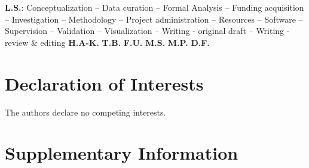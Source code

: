 \documentclass[5p]{elsarticle}
\begin{document}

\textbf{L.S.}:
Conceptualization --
Data curation --
Formal Analysis --
Funding acquisition --
Investigation --
Methodology --
Project administration --
Resources --
Software --
Supervision --
Validation --
Visualization --
Writing - original draft --
Writing - review \& editing
\textbf{H.A-K.}
\textbf{T.B.}
\textbf{F.U.}
\textbf{M.S.}
\textbf{M.P.}
\textbf{D.F.}




\section*{Declaration of Interests}

The authors declare no competing interests.

\renewcommand{\ttdefault}{\sfdefault}



\newpage
\onecolumn

\makeatletter
\renewcommand \thesection{S\@arabic\c@section}
\renewcommand\thetable{S\@arabic\c@table}
\renewcommand \thefigure{S\@arabic\c@figure}
\makeatother
\renewcommand{\citenumfont}[1]{S#1}
\setcounter{equation}{0}
\setcounter{figure}{0}
\setcounter{table}{0}
\setcounter{section}{0}


\section*{Supplementary Information}
\label{sec:si}













%



% 

\renewcommand{\ttdefault}{\sfdefault}
\end{document}
